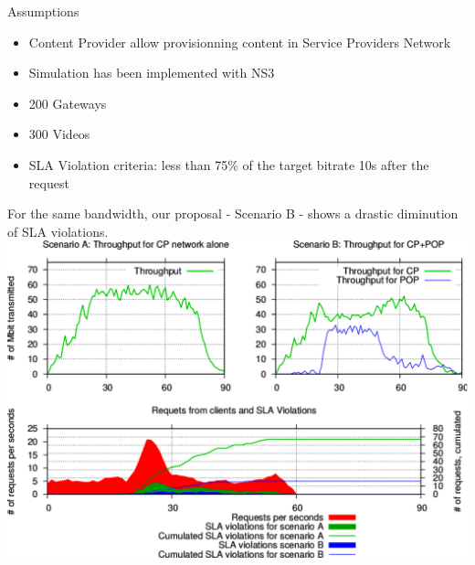 \documentclass[a4paper]{beamer}
\begin{document}
\begin{frame}{Assumptions}
	
			

  
		\begin{itemize}
			\item Content Provider allow provisionning content in Service Providers Network
			\item Simulation has been implemented with NS3
			\item 200 Gateways
			\item 300 Videos
			\item SLA Violation criteria: less than 75\% of the target bitrate 10s after the request
		\end{itemize}
										  
			
	
	
	
\end{frame}

\begin{frame}{For the same bandwidth, our proposal - Scenario B - shows a drastic diminution of SLA violations.}
	\includegraphics[width=0.90\linewidth]{CP+POP_evaluation.pdf}
\end{frame}
\end{document}
